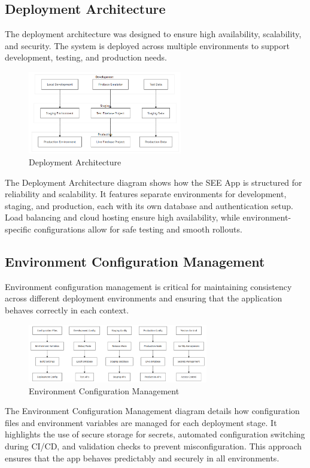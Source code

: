 ﻿\documentclass[12pt,a4paper]{article}
\newcommand{\sectiontitle}[1]{\subsection{#1}}
\begin{document}
\sectiontitle{Deployment Architecture}

The deployment architecture was designed to ensure high availability, scalability, and security. The system is deployed across multiple environments to support development, testing, and production needs.

\begin{figure}[H]
    \centering
    \includegraphics[width=0.6\textwidth,height=0.21\textwidth,keepaspectratio]{redrawn_diagrams/Figure6_Deployment_Architecture.png}
    \caption{Deployment Architecture}
    \label{fig:deployment}
\end{figure}
\vspace{0.5em}
The Deployment Architecture diagram shows how the SEE App is structured for reliability and scalability. It features separate environments for development, staging, and production, each with its own database and authentication setup. Load balancing and cloud hosting ensure high availability, while environment-specific configurations allow for safe testing and smooth rollouts.

\sectiontitle{Environment Configuration Management}

Environment configuration management is critical for maintaining consistency across different deployment environments and ensuring that the application behaves correctly in each context.

\begin{figure}[H]
    \centering
    \includegraphics[width=0.7\textwidth,height=0.23\textwidth,keepaspectratio]{redrawn_diagrams/Figure7_Environment_Config.png}
    \caption{Environment Configuration Management}
    \label{fig:env-config}
\end{figure}
\vspace{0.5em}
The Environment Configuration Management diagram details how configuration files and environment variables are managed for each deployment stage. It highlights the use of secure storage for secrets, automated configuration switching during CI/CD, and validation checks to prevent misconfiguration. This approach ensures that the app behaves predictably and securely in all environments.
\end{document}
